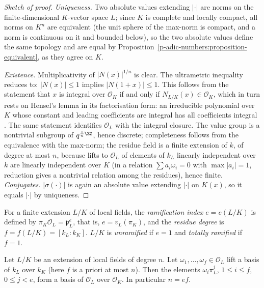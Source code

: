\begin{proof}[Sketch of proof]
\emph{Uniqueness.} Two absolute values extending $|\cdot|$ are norms on the finite-dimensional $K$-vector space $L$; since $K$ is complete and locally compact, all norms on $K^n$ are equivalent (the unit
sphere of the max-norm is compact, and a norm is continuous on it and bounded below), so the two absolute values define the same topology and are equal by
Proposition~\ref{p-adic-numbers:proposition-equivalent}, as they agree on $K$.

\emph{Existence.} Multiplicativity of $|N(x)|^{1/n}$ is clear. The ultrametric inequality reduces to: $|N(x)| \leq 1$ implies $|N(1 + x)| \leq 1$. This follows from the statement that $x$ is integral over
$\mathcal{O}_K$ if and only if $N_{L/K}(x) \in \mathcal{O}_K$, which in turn rests on Hensel's lemma in its factorisation form: an irreducible polynomial over $K$ whose constant and leading coefficients are
integral has all coefficients integral \cite[Chapter II, Theorem 4.8]{neukirch-ant}. The same statement identifies $\mathcal{O}_L$ with the integral closure. The value group is a nontrivial subgroup of
$q^{\frac1n\ZZ}$, hence discrete; completeness follows from the equivalence with the max-norm; the residue field is a finite extension of $k$, of degree at most $n$, because lifts to $\mathcal{O}_L$ of elements of $k_L$ linearly independent over $k$ are linearly independent over $K$ (in a relation
$\sum a_i\omega_i = 0$ with $\max|a_i| = 1$, reduction gives a nontrivial relation among the residues), hence finite.
\emph{Conjugates.} $|\sigma(\cdot)|$ is again an absolute value extending $|\cdot|$ on $K(x)$, so it equals $|\cdot|$ by uniqueness.
\end{proof}

\begin{definition}\label{local-fields:definition-e-f}
For a finite extension $L/K$ of local fields, the \emph{ramification index} $e = e(L/K)$ is defined by $\pi_K\mathcal{O}_L = \mathfrak{p}_L^e$, that is, $e = v_L(\pi_K)$, and the \emph{residue degree} is
$f = f(L/K) = [k_L : k_K]$. $L/K$ is \emph{unramified} if $e = 1$ and \emph{totally ramified} if $f = 1$.
\end{definition}

\begin{theorem}\label{local-fields:theorem-ef}
Let $L/K$ be an extension of local fields of degree $n$. Let $\omega_1, \dots, \omega_f \in \mathcal{O}_L$ lift a basis of $k_L$ over $k_K$ (here $f$ is a priori at most $n$). Then the elements
$\omega_i\pi_L^j$, $1 \leq i \leq f$, $0 \leq j < e$, form a basis of $\mathcal{O}_L$ over $\mathcal{O}_K$. In particular $n = ef$.
\end{theorem}

